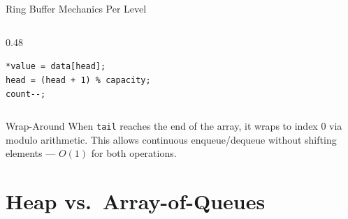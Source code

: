 \documentclass[aspectratio=169, 10pt]{beamer}
\begin{document}
\begin{frame}{Ring Buffer Mechanics Per Level}
\begin{columns}[T]
\begin{column}{0.48\textwidth}
\begin{center}
\end{center}

\vspace{0.5em}
\texttt{*value = data[head];}\\
\texttt{head = (head + 1) \% capacity;}\\
\texttt{count-{}-;}
\end{column}
\end{columns}

\vspace{0.5em}
\begin{block}{Wrap-Around}
When \texttt{tail} reaches the end of the array, it wraps to index 0
via modulo arithmetic. This allows continuous enqueue/dequeue without
shifting elements --- $O(1)$ for both operations.
\end{block}
\end{frame}

\section{Heap vs.\ Array-of-Queues}
\end{document}
